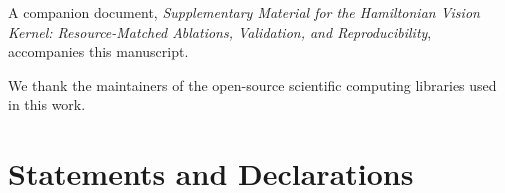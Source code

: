 \documentclass[pdflatex,sn-basic]{sn-jnl}
\begin{document}
\backmatter


A companion document, \textit{Supplementary Material for the Hamiltonian Vision
Kernel: Resource-Matched Ablations, Validation, and Reproducibility}, accompanies
this manuscript.


We thank the maintainers of the open-source scientific computing libraries used
in this work.

\section*{Statements and Declarations}
\end{document}
